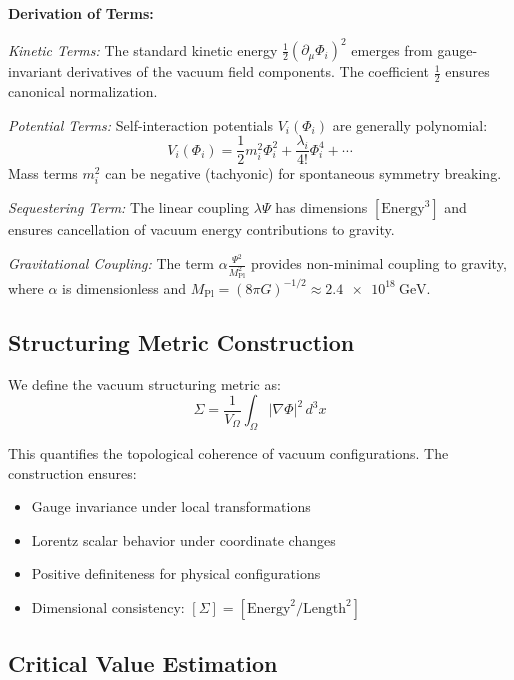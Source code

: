 \documentclass[12pt,a4paper]{article}
\newcommand{\structuring}{\Sigma}
\newcommand{\planck}{M_{\text{Pl}}}
\newcommand{\sequester}{\Psi}
\begin{document}
\textbf{Derivation of Terms:}

\textit{Kinetic Terms:} The standard kinetic energy $\frac{1}{2}(\partial_\mu\Phi_i)^2$ emerges from gauge-invariant derivatives of the vacuum field components. The coefficient $\frac{1}{2}$ ensures canonical normalization.

\textit{Potential Terms:} Self-interaction potentials $V_i(\Phi_i)$ are generally polynomial:
\begin{equation}
V_i(\Phi_i) = \frac{1}{2}m_i^2\Phi_i^2 + \frac{\lambda_i}{4!}\Phi_i^4 + \cdots
\end{equation}
Mass terms $m_i^2$ can be negative (tachyonic) for spontaneous symmetry breaking.

\textit{Sequestering Term:} The linear coupling $\lambda \sequester$ has dimensions $[\text{Energy}^3]$ and ensures cancellation of vacuum energy contributions to gravity.

\textit{Gravitational Coupling:} The term $\alpha\frac{\sequester^2}{\planck^2}$ provides non-minimal coupling to gravity, where $\alpha$ is dimensionless and $\planck = (8\pi G)^{-1/2} \approx \SI{2.4e18}{\giga\electronvolt}$.

\subsection{Structuring Metric Construction}

We define the vacuum structuring metric as:
\begin{equation}
\structuring = \frac{1}{V_\Omega}\int_\Omega |\nabla\Phi|^{2}\,d^{3}x
\label{eq:sigma}
\end{equation}

This quantifies the topological coherence of vacuum configurations. The construction ensures:
\begin{itemize}
\item Gauge invariance under local transformations
\item Lorentz scalar behavior under coordinate changes
\item Positive definiteness for physical configurations
\item Dimensional consistency: $[\structuring] = [\text{Energy}^2/\text{Length}^2]$
\end{itemize}

\subsection{Critical Value Estimation}
\end{document}
